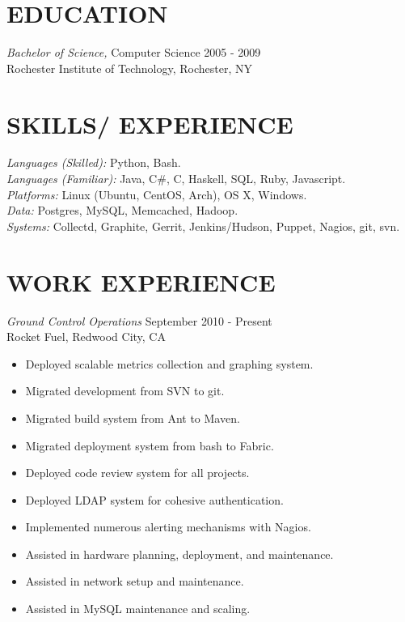 \documentclass[line,margin]{res}
\begin{document}
\address{Foster City, CA 94404}
\address{\sl tabletcorry@gmail.com}

\begin{resume}
 
\section{EDUCATION} {\sl Bachelor of Science,} Computer Science \hfill    2005 - 2009 \\
                Rochester Institute of Technology, Rochester, NY
 
\section{SKILLS/ EXPERIENCE} {\sl Languages (Skilled):} Python, Bash.\\
                {\sl Languages (Familiar):} Java, C\#, C, Haskell, SQL, Ruby, Javascript.\\
                {\sl Platforms:} Linux (Ubuntu, CentOS, Arch), OS X, Windows. \\
                {\sl Data:} Postgres, MySQL, Memcached, Hadoop. \\
                {\sl Systems:} Collectd, Graphite, Gerrit, Jenkins/Hudson, Puppet, Nagios, git, svn.
 
\section{WORK EXPERIENCE} 
                {\sl Ground Control Operations} \hfill September 2010 - Present \\
                Rocket Fuel, Redwood City, CA
                \begin{itemize}  \itemsep -2pt
                 \item Deployed scalable metrics collection and graphing system.
                 \item Migrated development from SVN to git.
                 \item Migrated build system from Ant to Maven.
                 \item Migrated deployment system from bash to Fabric.
                 \item Deployed code review system for all projects.
                 \item Deployed LDAP system for cohesive authentication.
                 \item Implemented numerous alerting mechanisms with Nagios.
                 \item Assisted in hardware planning, deployment, and maintenance.
                 \item Assisted in network setup and maintenance.
                 \item Assisted in MySQL maintenance and scaling.
                \end{itemize}


\end{resume}
\end{document}
